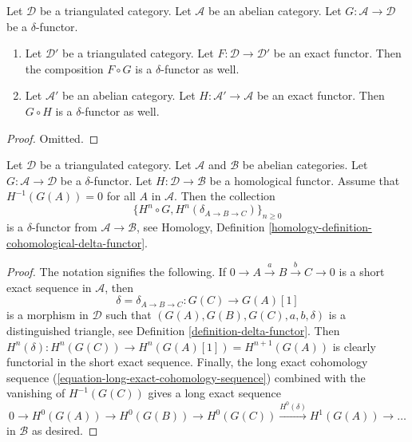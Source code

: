 \begin{lemma}
\label{lemma-exact-compose-delta-functor}
Let $\mathcal{D}$ be a triangulated category.
Let $\mathcal{A}$ be an abelian category.
Let $G : \mathcal{A} \to \mathcal{D}$ be a $\delta$-functor.
\begin{enumerate}
\item Let $\mathcal{D}'$ be a triangulated category.
Let $F : \mathcal{D} \to \mathcal{D}'$ be an exact functor.
Then the composition $F \circ G$ is a $\delta$-functor as well.
\item Let $\mathcal{A}'$ be an abelian category. Let
$H : \mathcal{A}' \to \mathcal{A}$ be an exact functor.
Then $G \circ H$ is a $\delta$-functor as well.
\end{enumerate}
\end{lemma}

\begin{proof}
Omitted.
\end{proof}

\begin{lemma}
\label{lemma-compose-delta-functor-homological}
Let $\mathcal{D}$ be a triangulated category.
Let $\mathcal{A}$ and $\mathcal{B}$ be abelian categories.
Let $G : \mathcal{A} \to \mathcal{D}$ be a $\delta$-functor.
Let $H : \mathcal{D} \to \mathcal{B}$ be a homological functor.
Assume that $H^{-1}(G(A)) = 0$ for all $A$ in $\mathcal{A}$.
Then the collection
$$
\{H^n \circ G, H^n(\delta_{A \to B \to C})\}_{n \geq 0}
$$
is a $\delta$-functor from $\mathcal{A} \to \mathcal{B}$, see
Homology, Definition \ref{homology-definition-cohomological-delta-functor}.
\end{lemma}

\begin{proof}
The notation signifies the following. If
$0 \to A \xrightarrow{a} B \xrightarrow{b} C \to 0$ is
a short exact sequence in $\mathcal{A}$, then
$$
\delta = \delta_{A \to B \to C} : G(C) \to G(A)[1]
$$
is a morphism in $\mathcal{D}$ such that
$(G(A), G(B), G(C), a, b, \delta)$ is
a distinguished triangle, see
Definition \ref{definition-delta-functor}.
Then $H^n(\delta) : H^n(G(C)) \to H^n(G(A)[1]) = H^{n + 1}(G(A))$
is clearly functorial in the short exact sequence.
Finally, the long exact cohomology sequence
(\ref{equation-long-exact-cohomology-sequence})
combined with the vanishing of $H^{-1}(G(C))$
gives a long exact sequence
$$
0 \to H^0(G(A)) \to H^0(G(B)) \to H^0(G(C))
\xrightarrow{H^0(\delta)} H^1(G(A)) \to \ldots
$$
in $\mathcal{B}$ as desired.
\end{proof}

